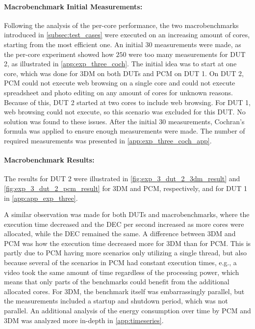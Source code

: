 \paragraph*{Macrobenchmark Initial Measurements:} Following the analysis of the per-core performance, the two macrobenchmarks introduced in \cref{subsec:test_cases} were executed on an increasing amount of cores, starting from the most efficient one. An initial $30$ measurements were made, as the per-core experiment showed how $250$ were too many measurements for DUT 2, as illustrated in \cref{app:exp_three_coch}. The initial idea was to start at one core, which was done for 3DM on both DUTs and PCM on DUT 1. On DUT 2, PCM could not execute web browsing on a single core and could not execute spreadsheet and photo editing on any amount of cores for unknown reasons. Because of this, DUT 2 started at two cores to include web browsing. For DUT 1, web browsing could not execute, so this scenario was excluded for this DUT. No solution was found to these issues. After the initial $30$ measurements, Cochran's formula was applied to ensure enough measurements were made. The number of required measurements was presented in \cref{app:exp_three_coch_app}.



\paragraph*{Macrobenchmark Results:} The results for DUT 2 were illustrated in \cref{fig:exp_3_dut_2_3dm_result} and \cref{fig:exp_3_dut_2_pcm_result} for 3DM and PCM, respectively, and for DUT 1 in \cref{app:app_exp_three}.

A similar observation was made for both DUTs and macrobenchmarks, where the execution time decreased and the DEC per second increased as more cores were allocated, while the DEC remained the same. A difference between 3DM and PCM was how the execution time decreased more for 3DM than for PCM. This is partly due to PCM having more scenarios only utilizing a single thread, but also because several of the scenarios in PCM had constant execution times, e.g., a video took the same amount of time regardless of the processing power, which means that only parts of the benchmarks could benefit from the additional allocated cores. For 3DM, the benchmark itself was embarrassingly parallel, but the measurements included a startup and shutdown period, which was not parallel. An additional analysis of the energy consumption over time by PCM and 3DM was analyzed more in-depth in \cref{app:timeseries}.

